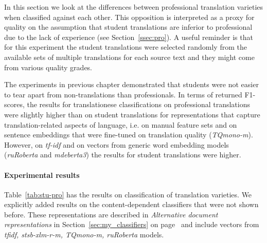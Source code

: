 In this section we look at the differences between professional translation varieties when classified against each other. This opposition is interpreted as a proxy for quality on the assumption that student translations are inferior to professional due to the lack of experience (see Section~\ref{ssec:pro}). A useful reminder is that for this experiment the student translations were selected randomly from the available sets of multiple translations for each source text and they might come from various quality grades. 

The experiments in previous chapter demonstrated that students were not easier to tear apart from non-translations than professionals. In terms of returned F1-scores, the results for translationese classifications on professional translations were slightly higher than on student translations for representations that capture translation-related aspects of language, i.e. on manual feature sets and on sentence embeddings that were fine-tuned on translation quality (\textit{TQmono-m}). However, on \textit{tf-idf} and on vectors from generic word embedding models (\textit{ruRoberta} and \textit{mdeberta3}) the results for student translations were higher.

\paragraph{Experimental results}
Table~\ref{tab:stu-pro} has the results on classification of translation varieties. We explicitly added results on the content-dependent classifiers that were not shown before. These representations are described in \textit{Alternative document representations} in Section~\ref{sec:my_classifiers} on page~\pageref{pg:vectors}  and include vectors from \textit{tfidf, stsb-xlm-r-m, TQmono-m, ruRoberta} models.

